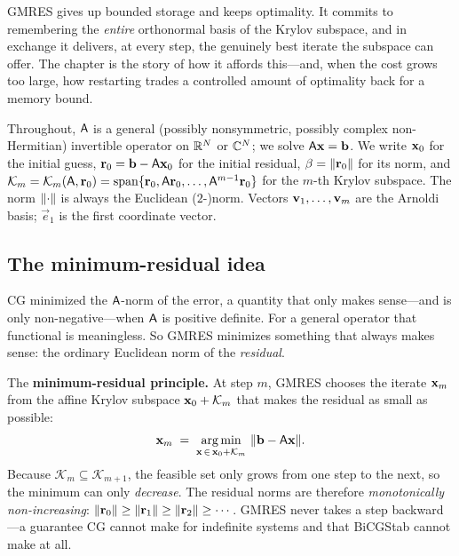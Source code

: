 GMRES gives up bounded storage and keeps optimality. It commits to remembering the
\emph{entire} orthonormal basis of the Krylov subspace, and in exchange it delivers,
at every step, the genuinely best iterate the subspace can offer. The chapter is the
story of how it affords this---and, when the cost grows too large, how restarting
trades a controlled amount of optimality back for a memory bound.

\begin{notationbox}
Throughout, $\mathsf{A}$ is a general (possibly nonsymmetric, possibly complex
non-Hermitian) invertible operator on $\mathbb{R}^N$ or $\mathbb{C}^N$; we solve
$\mathsf{A}\mathbf{x}=\mathbf{b}$. We write $\mathbf{x}_0$ for the initial guess, $\mathbf{r}_0=\mathbf{b}-\mathsf{A}\mathbf{x}_0$
for the initial residual, $\beta=\lVert\mathbf{r}_0\rVert$ for its norm, and
$\mathcal{K}_m=\mathcal{K}_m(\mathsf{A},\mathbf{r}_0)=\operatorname{span}\{\mathbf{r}_0,\mathsf{A}\mathbf{r}_0,
\dots,\mathsf{A}^{m-1}\mathbf{r}_0\}$ for the $m$-th Krylov subspace. The norm $\lVert\cdot\rVert$
is always the Euclidean ($2$-)norm. Vectors $\mathbf{v}_1,\dots,\mathbf{v}_m$ are the Arnoldi
basis; $\vec e_1$ is the first coordinate vector.
\end{notationbox}

\subsection{The minimum-residual idea}

CG minimized the $\mathsf{A}$-norm of the error, a quantity that only makes sense---and
is only non-negative---when $\mathsf{A}$ is positive definite. For a general operator
that functional is meaningless. So GMRES minimizes something that always makes
sense: the ordinary Euclidean norm of the \emph{residual}.

\begin{keyidea}
The \textbf{minimum-residual principle.} At step $m$, GMRES chooses the iterate
$\mathbf{x}_m$ from the affine Krylov subspace $\mathbf{x}_0+\mathcal{K}_m$ that makes the
residual as small as possible:
\[
  \vx_m \;=\; \operatorname*{arg\,min}_{\vx\,\in\,\vx_0+\mathcal{K}_m}\ \norm{\vb-\mat{A}\vx}.
\]
Because $\mathcal{K}_m\subseteq\mathcal{K}_{m+1}$, the feasible set only grows from
one step to the next, so the minimum can only \emph{decrease}. The residual norms
are therefore \emph{monotonically non-increasing}: $\lVert\mathbf{r}_0\rVert\ge\lVert\mathbf{r}_1\rVert\ge
\lVert\mathbf{r}_2\rVert\ge\cdots$. GMRES never takes a step backward---a guarantee CG cannot
make for indefinite systems and that BiCGStab cannot make at all.
\end{keyidea}

